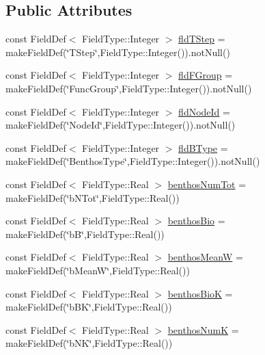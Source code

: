 \subsection*{Public Attributes}
\begin{DoxyCompactItemize}
\item 
const Field\+Def$<$ Field\+Type\+::\+Integer $>$ \mbox{\hyperlink{class_func_groups_table_a7201008a4493f66703986c86791c5d39}{fld\+T\+Step}} = make\+Field\+Def(\char`\"{}T\+Step\char`\"{},Field\+Type\+::\+Integer()).not\+Null()
\item 
const Field\+Def$<$ Field\+Type\+::\+Integer $>$ \mbox{\hyperlink{class_func_groups_table_a024e31f16c33f326f035fecdd3c3e59a}{fld\+F\+Group}} = make\+Field\+Def(\char`\"{}Func\+Group\char`\"{},Field\+Type\+::\+Integer()).not\+Null()
\item 
const Field\+Def$<$ Field\+Type\+::\+Integer $>$ \mbox{\hyperlink{class_func_groups_table_a5971770a3ec371afa50628710acaff70}{fld\+Node\+Id}} = make\+Field\+Def(\char`\"{}Node\+Id\char`\"{},Field\+Type\+::\+Integer()).not\+Null()
\item 
const Field\+Def$<$ Field\+Type\+::\+Integer $>$ \mbox{\hyperlink{class_func_groups_table_a2f5a3e70984ba21d6d9b50e248d5a902}{fld\+B\+Type}} = make\+Field\+Def(\char`\"{}Benthos\+Type\char`\"{},Field\+Type\+::\+Integer()).not\+Null()
\item 
const Field\+Def$<$ Field\+Type\+::\+Real $>$ \mbox{\hyperlink{class_func_groups_table_a804729341f824891cbb8f5e79e2192ca}{benthos\+Num\+Tot}} = make\+Field\+Def(\char`\"{}b\+N\+Tot\char`\"{},Field\+Type\+::\+Real())
\item 
const Field\+Def$<$ Field\+Type\+::\+Real $>$ \mbox{\hyperlink{class_func_groups_table_a6e4d052ca72af15eeee2f40dfdc362fe}{benthos\+Bio}} = make\+Field\+Def(\char`\"{}bB\char`\"{},Field\+Type\+::\+Real())
\item 
const Field\+Def$<$ Field\+Type\+::\+Real $>$ \mbox{\hyperlink{class_func_groups_table_a0d86a44731f123d72a0909abd2a6609f}{benthos\+MeanW}} = make\+Field\+Def(\char`\"{}b\+MeanW\char`\"{},Field\+Type\+::\+Real())
\item 
const Field\+Def$<$ Field\+Type\+::\+Real $>$ \mbox{\hyperlink{class_func_groups_table_ae38007b128d63bfb55104684d64864c1}{benthos\+BioK}} = make\+Field\+Def(\char`\"{}b\+BK\char`\"{},Field\+Type\+::\+Real())
\item 
const Field\+Def$<$ Field\+Type\+::\+Real $>$ \mbox{\hyperlink{class_func_groups_table_adaeeb472bb3aacda817d6d942a40045a}{benthos\+NumK}} = make\+Field\+Def(\char`\"{}b\+NK\char`\"{},Field\+Type\+::\+Real())
\end{DoxyCompactItemize}


